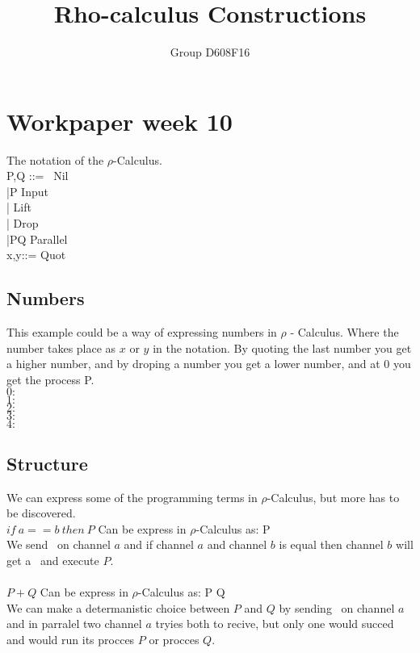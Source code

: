 

\author{Group D608F16}
\title{Rho-calculus Constructions}



\maketitle

\section{Workpaper week 10}
The notation of the $\rho$-Calculus.\citep{Meredith2005}\\
P,Q ::= \nil \ Nil\\
|P Input\\
| Lift\\
| Drop\\
|P\para Q Parallel\\
x,y::=  Quot\\


\subsection{Numbers}
This example could be a way of expressing numbers in $\rho$ - Calculus. Where the number takes place as $x$ or $y$ in the notation. By quoting the last number you get a higher number, and by droping a number you get a lower number, and at 0 you get the process P.\\
$0:$ \quot{\nil}\\
$1:$ \quot{\lift{\quot{\nil}}{\nil}}\\
$2:$ \quot{\lift{\quot{\nil}}{\lift{\quot{\nil}}{\nil}}}\\
$3:$ \quot{\lift{\quot{\nil}}{\lift{\quot{\nil}}{\lift{\quot{\nil}}{\nil}}}}\\
$4:$ \quot{\lift{\quot{\nil}}{\lift{\quot{\nil}}{\lift{\quot{\nil}}{\lift{\quot{\nil}}{\nil}}}}}\\

\subsection{Structure}
We can express some of the programming terms in $\rho$-Calculus, but more has to be discovered.\\
$if\ a == b\ then\ P$ Can be express in $\rho$-Calculus as:  \para {}P
\\ We send \nil \ on channel $a$ and if channel $a$ and channel $b$ is equal then channel $b$ will get a  \nil \ and execute $P$.
\\\\
$P+Q$ Can be express in $\rho$-Calculus as:  \para {}P \para {}Q
\\We can make a determanistic choice between $P$ and $Q$ by sending \nil \ on channel $a$ and in parralel two channel $a$ tryies both to recive, but only one would succed and would run its procces $P$ or procces $Q$.

